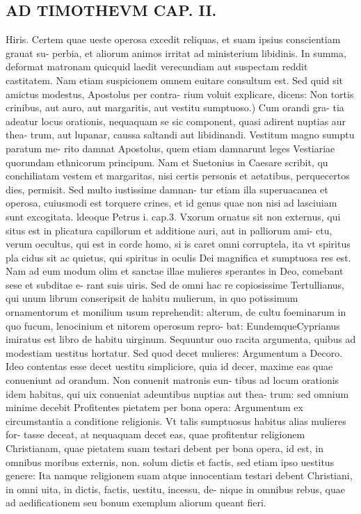 \documentclass{article}
\begin{document}
\begin{pages}
\section*{AD TIMOTHEVM CAP. II. }
\marginpar{[ p.71 ]}\pstart Hiris. Certem quae ueste operosa excedit reliquas, et suam ipsius conscientiam grauat su- perbia, et aliorum animos irritat ad ministerium libidinis. In summa, deformat matronam quicquid laedit verecundiam aut suspectam reddit castitatem. Nam etiam suspicionem omnem euitare consultum est. Sed quid sit amictus modestus, Apostolus per contra- rium voluit explicare, dicens:  \pend\pstart Non tortis crinibus, aut auro, aut margaritis, aut vestitu sumptuoso.) Cum orandi gra- tia adeatur locus orationis, nequaquam se sic component, quasi adirent nuptias aur thea- trum, aut lupanar, caussa saltandi aut libidinandi. Vestitum magno sumptu paratum me- rito damnat Apostolus, quem etiam damnarunt leges Vestiariae quorundam ethnicorum principum. Nam et Suetonius in Caesare scribit, qu conchiliatam vestem et margaritas, nisi certis personis et aetatibus, perquecertos dies, permisit. Sed multo iustissime damnan- tur etiam illa superuacanea et operosa, cuiusmodi est torquere crines, et id genus quae non nisi ad lasciuiam sunt excogitata. ldeoque  Petrus i. cap.3. Vxorum ornatus sit non externus, qui situs est in plicatura capillorum et additione auri, aut in palliorum ami- ctu, verum oecultus, qui est in corde homo, si is caret omni corruptela, ita vt spiritus pla cidus sit ac quietus, qui spiritus in oculis Dei magnifica et sumptuosa res est. Nam ad eum modum olim et sanctae illae mulieres sperantes in Deo, comebant sese et subditae e- rant suis uiris. Sed de omni hac re copiosissime Tertullianus, qui unum librum conseripsit de habitu mulierum, in quo potissimum ornamentorum et monilium usum reprehendit: alterum, de cultu foeminarum in quo fucum, lenocinium et nitorem operosum repro- bat: EundemqueCyprianus imiratus est libro de habitu uirginum.  \pend\pstart Sequuntur ouo racita argumenta, quibus ad modestiam uestitus hortatur. Sed quod decet mulieres: Argumentum a Decoro. Ideo contentas esse decet uestitu simpliciore, quia id decer, maxime eas quae conueniunt ad orandum. Non conuenit matronis eun- tibus ad locum orationis idem habitus, qui uix conueniat adeuntibus nuptias aut thea- trum: sed omnium minime decebit Profitentes pietatem per bona opera: Argumentum ex circumstantia a conditione religionis. Vt talis sumptuosus habitus alias mulieres for- tasse deceat, at nequaquam decet eas, quae profitentur religionem Christianam, quae pietatem suam testari debent per bona opera, id est, in omnibus moribus externis, non. solum dictis et factis, sed etiam ipso uestitus genere: Ita namque  religionem suam atque  innocentiam testari debent Christiani, in omni uita, in dictis, factis, uestitu, incessu, de- nique  in omnibus rebus, quae ad aedificationem seu bonum exemplum aliorum queant fieri.  \pend
{}
{}

\end{pages}
\end{document}
